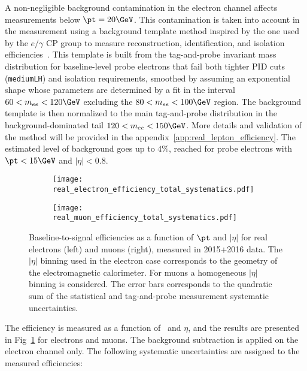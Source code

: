 A non-negligible background contamination in the electron channel affects measurements below $\pt=20 \GeV$. 
This contamination is taken into account in the measurement using a background template method inspired by the one used by the $e/\gamma$ CP group to measure reconstruction, identification, and isolation efficiencies~\cite{ATLAS-CONF-2014-032}. 
This template is built from the tag-and-probe invariant mass distribution for baseline-level probe electrons that fail both tighter PID cuts (\texttt{mediumLH}) and isolation requirements, smoothed by assuming an exponential shape whose parameters are determined by a fit in the interval $60<m_{ee}<120 \GeV$ excluding the $80<m_{ee}< 100 \GeV$ region. 
The background template is then normalized to the main tag-and-probe distribution in the background-dominated tail $120<m_{ee}<150 \GeV$. 
More details and validation of the method will be provided in the appendix~\ref{app:real_lepton_efficiency}. 
The estimated level of background goes up to $4\%$, reached for probe electrons with $\pt<15 \GeV$ and $|\eta|<0.8$. 

\begin{figure}[t!]
\centering
\begin{subfigure}{0.49\textwidth}
\texttt{[image: real\_electron\_efficiency\_total\_systematics.pdf]}
\end{subfigure}
\begin{subfigure}{0.49\textwidth}
\texttt{[image: real\_muon\_efficiency\_total\_systematics.pdf]}
\end{subfigure}
\caption{Baseline-to-signal efficiencies as a function of $\pt$ and $|\eta|$ for real electrons (left) and muons (right), measured in 2015+2016 data.
The $|\eta|$ binning used in the electron case corresponds to the geometry of the electromagnetic calorimeter.
For muons a homogeneous $|\eta|$ binning is considered.
The error bars corresponds to the quadratic sum of the statistical and tag-and-probe measurement systematic uncertainties.}
\label{fig:prompt_leptons_eff}
\end{figure}

The efficiency is measured as a function of \pt\ and $\eta$, and the results are presented in Fig~\ref{fig:prompt_leptons_eff} for electrons and muons. 
The background subtraction is applied on the electron channel only. 
The following systematic uncertainties are assigned to the measured efficiencies: 

